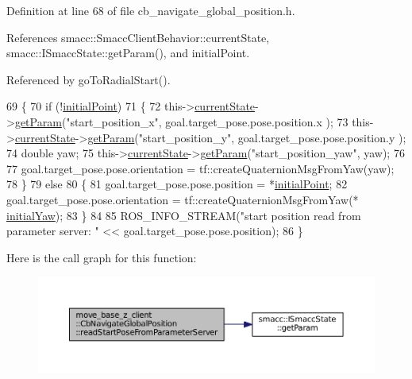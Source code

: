 Definition at line 68 of file cb\+\_\+navigate\+\_\+global\+\_\+position.\+h.



References smacc\+::\+Smacc\+Client\+Behavior\+::current\+State, smacc\+::\+I\+Smacc\+State\+::get\+Param(), and initial\+Point.



Referenced by go\+To\+Radial\+Start().


\begin{DoxyCode}
69   \{
70     \textcolor{keywordflow}{if} (!\hyperlink{classmove__base__z__client_1_1CbNavigateGlobalPosition_a603d293ad4557e8332fcfd264d7075d4}{initialPoint})
71     \{
72       this->\hyperlink{classsmacc_1_1SmaccClientBehavior_af76fc9b877542ed5caf033f820c107d0}{currentState}->\hyperlink{classsmacc_1_1ISmaccState_abbb3a24b912c6e8de28f7b86123b6357}{getParam}(\textcolor{stringliteral}{"start\_position\_x"}, goal.target\_pose.pose.position.x
      );
73       this->\hyperlink{classsmacc_1_1SmaccClientBehavior_af76fc9b877542ed5caf033f820c107d0}{currentState}->\hyperlink{classsmacc_1_1ISmaccState_abbb3a24b912c6e8de28f7b86123b6357}{getParam}(\textcolor{stringliteral}{"start\_position\_y"}, goal.target\_pose.pose.position.y
      );
74       \textcolor{keywordtype}{double} yaw;
75       this->\hyperlink{classsmacc_1_1SmaccClientBehavior_af76fc9b877542ed5caf033f820c107d0}{currentState}->\hyperlink{classsmacc_1_1ISmaccState_abbb3a24b912c6e8de28f7b86123b6357}{getParam}(\textcolor{stringliteral}{"start\_position\_yaw"}, yaw);
76 
77       goal.target\_pose.pose.orientation = tf::createQuaternionMsgFromYaw(yaw);
78     \}
79     \textcolor{keywordflow}{else}
80     \{
81       goal.target\_pose.pose.position = *\hyperlink{classmove__base__z__client_1_1CbNavigateGlobalPosition_a603d293ad4557e8332fcfd264d7075d4}{initialPoint};
82       goal.target\_pose.pose.orientation = tf::createQuaternionMsgFromYaw(*
      \hyperlink{classmove__base__z__client_1_1CbNavigateGlobalPosition_a339ec9b992e2565f404d8a2fa8a5be87}{initialYaw});
83     \}
84 
85     ROS\_INFO\_STREAM(\textcolor{stringliteral}{"start position read from parameter server: "} << goal.target\_pose.pose.position);
86   \}
\end{DoxyCode}


Here is the call graph for this function\+:
\nopagebreak
\begin{figure}[H]
\begin{center}
\leavevmode
\includegraphics[width=350pt]{classmove__base__z__client_1_1CbNavigateGlobalPosition_a866ea02c9e25ac1df9df88272deb04b3_cgraph}
\end{center}
\end{figure}




